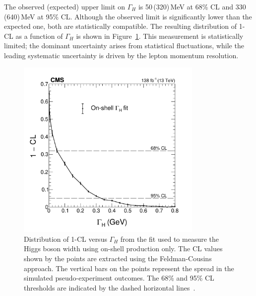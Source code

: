 The observed (expected) upper limit on $\Gamma_H$ is 50\,(320)\,MeV at 68\% CL and 330\,(640)\,MeV at 95\% CL. Although the observed limit is significantly lower than the expected one, both are statistically compatible. The resulting distribution of 1-CL as a function of $\Gamma_H$ is shown in Figure~\ref{OnShell_width}. This measurement is statistically limited; the dominant uncertainty arises from statistical fluctuations, while the leading systematic uncertainty is driven by the lepton momentum resolution.

\begin{figure}[!hbt]
  \centering
  \includegraphics[width=0.8\textwidth]{figures/Figure_010.pdf}
  \caption{Distribution of 1-CL versus $\Gamma_H$ from the fit used to measure the Higgs boson width using on-shell production only. The CL values shown by the points are extracted using the Feldman-Cousins approach. The vertical bars on the points represent the spread in the simulated pseudo-experiment outcomes. The 68\% and 95\% CL thresholds are indicated by the dashed horizontal lines~\cite{PhysRevD.111.092014}.}
  \label{OnShell_width}
\end{figure}
